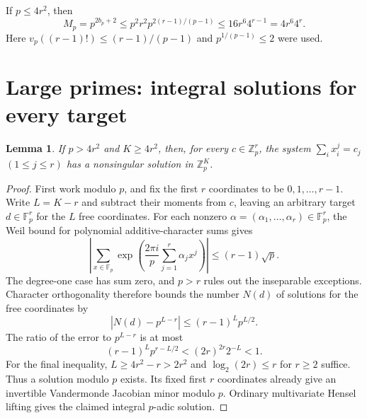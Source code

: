 \documentclass[11pt]{article}
\newtheorem{lemma}[theorem]{Lemma}
\newcommand{\Z}{\mathbb Z}
\newcommand{\Fp}{\mathbb F_p}
\begin{document}
If $p\le4r^2$, then
\begin{equation}\label{uniformM}
 M_p=p^{2b_p+2}
 \le p^2r^2p^{2(r-1)/(p-1)}
 \le16r^6 4^{r-1}=4r^6 4^r.
\end{equation}
Here $v_p((r-1)!)\le(r-1)/(p-1)$ and
$p^{1/(p-1)}\le2$ were used.

\section{Large primes: integral solutions for every target}
\begin{lemma}\label{largeprime}
If $p>4r^2$ and $K\ge4r^2$, then, for every
$c\in\Z_p^r$, the system $\sum_i x_i^j=c_j$ $(1\le j\le r)$ has a
nonsingular solution in $\Z_p^K$.
\end{lemma}
\begin{proof}
First work modulo $p$, and fix the first $r$ coordinates to be
$0,1,\ldots,r-1$. Write $L=K-r$ and subtract their moments from $c$,
leaving an arbitrary target $d\in\Fp^r$ for the $L$ free coordinates.
For each nonzero $\alpha=(\alpha_1,\ldots,\alpha_r)\in\Fp^r$, the Weil
bound for polynomial additive-character sums \cite{weil} gives
\[
 \left|\sum_{x\in\Fp}
   \exp\left(\frac{2\pi i}{p}\sum_{j=1}^r\alpha_j x^j\right)\right|
 \le(r-1)\sqrt p.
\]
The degree-one case has sum zero, and $p>r$ rules out the inseparable
exceptions. Character orthogonality therefore bounds the number $N(d)$
of solutions for the free coordinates by
\[
 \left|N(d)-p^{L-r}\right|
 \le (r-1)^L p^{L/2}.
\]
The ratio of the error to $p^{L-r}$ is at most
\[
 (r-1)^L p^{r-L/2}
 < (2r)^{2r}2^{-L}<1.
\]
For the final inequality, $L\ge4r^2-r>2r^2$ and
$\log_2(2r)\le r$ for $r\ge2$ suffice. Thus a solution modulo $p$ exists.
Its fixed first $r$ coordinates already give an invertible Vandermonde
Jacobian minor modulo $p$. Ordinary multivariate Hensel lifting gives the
claimed integral $p$-adic solution.
\end{proof}
\end{document}
